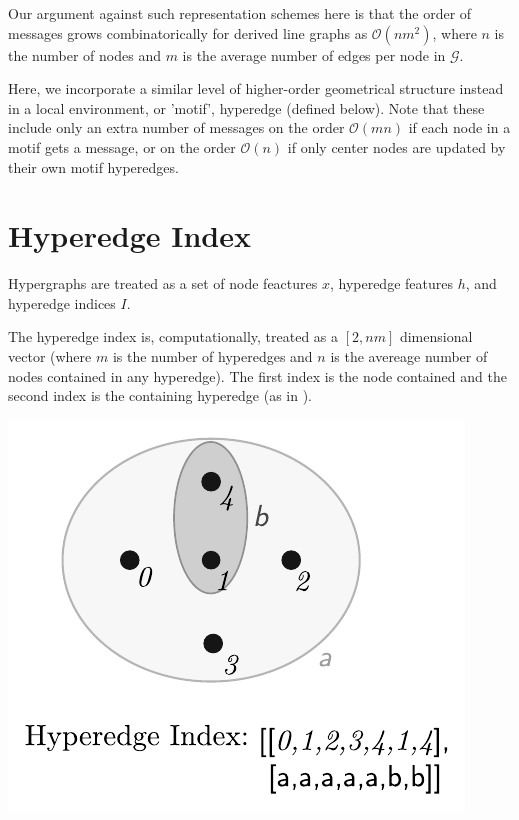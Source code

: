 \documentclass[10pt,a4paper,twocolumn]{article}
\begin{document}
Our argument against such representation schemes here is that the order of messages grows combinatorically for derived line graphs as $\mathcal{O}(nm^2)$, where $n$ is the number of nodes and $m$ is the average number of edges per node in $\mathcal{G}$.

Here, we incorporate a similar level of higher-order geometrical structure instead in a local environment, or 'motif', hyperedge (defined below). Note that these include only an extra number of messages on the order $\mathcal{O}(mn)$ if each node in a motif gets a message, or on the order $\mathcal{O}(n)$ if only center nodes are updated by their own motif hyperedges.


\section{Hyperedge Index}
Hypergraphs are treated as a set of node feactures $x$, hyperedge features $h$, and hyperedge indices $I$. 

The hyperedge index is, computationally, treated as a $[2,nm]$ dimensional vector (where $m$ is the number of hyperedges and $n$ is the avereage number of nodes contained in any hyperedge). 
The first index is the node contained and the second index is the containing hyperedge (as in \cite{hypergraphconv}).
\begin{center}
\includegraphics[scale = 1]{hyperedge_index.pdf}
\end{center}
\end{document}
